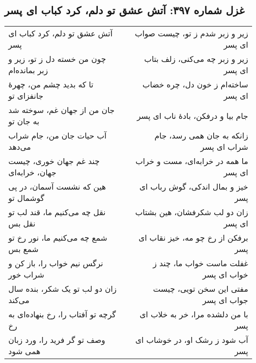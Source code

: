 \begin{center}
\section*{غزل شماره ۳۹۷: آتش عشق تو دلم، کرد کباب ای پسر}
\label{sec:397}
\begin{longtable}{l p{0.5cm} r}
آتش عشق تو دلم، کرد کباب ای پسر
&&
زیر و زبر شدم ز تو، چیست صواب ای پسر
\\
چون من خسته دل ز تو، زیر و زبر بمانده‌ام
&&
زیر و زبر چه می‌کنی، زلف بتاب ای پسر
\\
تا که بدید چشم من، چهرهٔ جانفزای تو
&&
ساخته‌ام ز خون دل، چره خضاب ای پسر
\\
جان من از جهان غم، سوخته شد به جان تو
&&
جام بیا و درفکن، بادهٔ ناب ای پسر
\\
آب حیات جان من، جام شراب می‌دهد
&&
زانکه به جان همی رسد، جام شراب ای پسر
\\
چند غم جهان خوری، چیست جهان، خرابه‌ای
&&
ما همه در خرابه‌ای، مست و خراب ای پسر
\\
هین که نشست آسمان، در پی گوشمال تو
&&
خیز و بمال اندکی، گوش رباب ای پسر
\\
نقل چه می‌کنیم ما، قند لب تو نقل بس
&&
زان دو لب شکرفشان، هین بشتاب ای پسر
\\
شمع چه می‌کنیم ما، نور رخ تو شمع بس
&&
برفکن از رخ چو مه، خیز نقاب ای پسر
\\
نرگس نیم خواب را، باز کن و شراب خور
&&
غفلت ماست خواب ما، چند ز خواب ای پسر
\\
زان دو لب تو یک شکر، بنده سال می‌کند
&&
مفتی این سخن تویی، چیست جواب ای پسر
\\
گرچه تو آفتاب را، رخ بنهاده‌ای به رخ
&&
با من دلشده مرا، خر به خلاب ای پسر
\\
وصف تو گر فرید را، ورد زبان همی شود
&&
آب شود ز رشک او، در خوشاب ای پسر
\\
\end{longtable}
\end{center}
